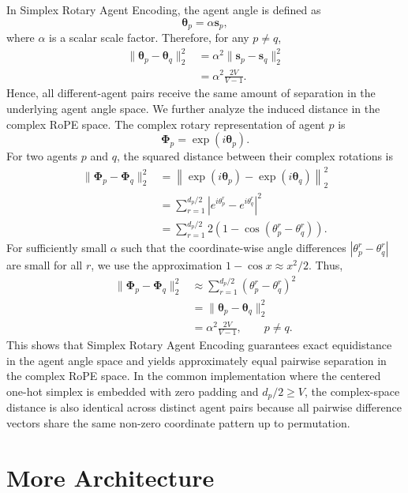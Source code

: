 \documentclass{llmxive}
\begin{document}
In Simplex Rotary Agent Encoding, the agent angle is defined as
\begin{equation}
\boldsymbol{\theta}_p
=
\alpha\mathbf{s}_p,
\end{equation}
where $\alpha$ is a scalar scale factor. 
Therefore, for any $p\neq q$,
\begin{align}
\|\boldsymbol{\theta}_p-\boldsymbol{\theta}_q\|_2^2
&=
\alpha^2
\|\mathbf{s}_p-\mathbf{s}_q\|_2^2 \\
&=
\alpha^2
\frac{2V}{V-1}.
\end{align}
Hence, all different-agent pairs receive the same amount of separation in the underlying agent angle space. We further analyze the induced distance in the complex RoPE space. 
The complex rotary representation of agent $p$ is
\begin{equation}
\boldsymbol{\Phi}_p
=
\exp(i\boldsymbol{\theta}_p).
\end{equation}
For two agents $p$ and $q$, the squared distance between their complex rotations is
\begin{align}
\|\boldsymbol{\Phi}_p-\boldsymbol{\Phi}_q\|_2^2
&=
\left\|
\exp(i\boldsymbol{\theta}_p)
-
\exp(i\boldsymbol{\theta}_q)
\right\|_2^2 \\
&=
\sum_{r=1}^{d_p/2}
\left|
e^{i\theta_p^r}
-
e^{i\theta_q^r}
\right|^2 \\
&=
\sum_{r=1}^{d_p/2}
2\left(
1-\cos(\theta_p^r-\theta_q^r)
\right).
\end{align}
For sufficiently small $\alpha$ such that the coordinate-wise angle differences $|\theta_p^r-\theta_q^r|$ are small for all $r$, we use the approximation $1-\cos x\approx x^2/2$. 
Thus,
\begin{align}
\|\boldsymbol{\Phi}_p-\boldsymbol{\Phi}_q\|_2^2
&\approx
\sum_{r=1}^{d_p/2}
(\theta_p^r-\theta_q^r)^2 \\
&=
\|\boldsymbol{\theta}_p-\boldsymbol{\theta}_q\|_2^2 \\
&=
\alpha^2
\frac{2V}{V-1},
\qquad p\neq q.
\end{align}
This shows that Simplex Rotary Agent Encoding guarantees exact equidistance in the agent angle space and yields approximately equal pairwise separation in the complex RoPE space. 
In the common implementation where the centered one-hot simplex is embedded with zero padding and $d_p/2\geq V$, the complex-space distance is also identical across distinct agent pairs because all pairwise difference vectors share the same non-zero coordinate pattern up to permutation.

\section{More Architecture}
\label{app:more-architecture}
\end{document}
